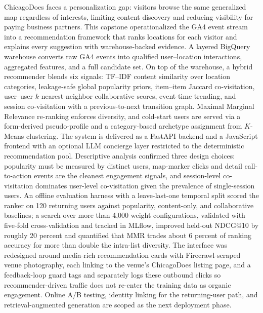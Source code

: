 \documentclass[12pt,letterpaper]{article}
\begin{document}
ChicagoDoes faces a personalization gap: visitors browse the same
generalized map regardless of interests, limiting content discovery
and reducing visibility for paying business partners. This capstone
operationalized the GA4 event stream into a recommendation framework
that ranks locations for each visitor and explains every suggestion
with warehouse-backed evidence. A layered BigQuery warehouse converts
raw GA4 events into qualified user--location interactions, aggregated
features, and a full candidate set. On top of the warehouse, a hybrid
recommender blends six signals: TF--IDF content similarity over
location categories, leakage-safe global popularity priors, item--item
Jaccard co-visitation, user--user $k$-nearest-neighbor collaborative
scores, event-time trending, and session co-visitation with a
previous-to-next transition graph. Maximal Marginal Relevance
re-ranking enforces diversity, and cold-start users are served via a
form-derived pseudo-profile and a category-based archetype assignment
from $K$-Means clustering. The system is delivered as a FastAPI
backend and a JavaScript frontend with an optional LLM concierge layer
restricted to the deterministic recommendation pool. Descriptive
analysis confirmed three design choices: popularity must be measured
by distinct users, map-marker clicks and detail call-to-action events
are the cleanest engagement signals, and session-level co-visitation
dominates user-level co-visitation given the prevalence of
single-session users. An offline evaluation harness with a
leave-last-one temporal split scored the ranker on 120 returning
users against popularity, content-only, and collaborative baselines;
a search over more than 4{,}000 weight configurations, validated
with five-fold cross-validation and tracked in MLflow, improved
held-out NDCG@10 by roughly 20 percent and quantified that MMR
trades about 6 percent of ranking accuracy for more than double the
intra-list diversity. The interface was redesigned around media-rich
recommendation cards with Firecrawl-scraped venue photography, each
linking to the venue's ChicagoDoes listing page, and a feedback-loop
guard tags and separately logs these outbound clicks so
recommender-driven traffic does not re-enter the training data as
organic engagement. Online A/B testing, identity linking for
the returning-user path, and retrieval-augmented generation are
scoped as the next deployment phase.

\newpage

\setcounter{tocdepth}{2}
\tableofcontents
\listoffigures
\listoftables
\newpage
\end{document}

